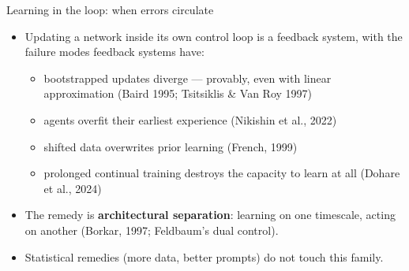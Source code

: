 \documentclass[11pt]{beamer}
\begin{document}
\begin{frame}{Learning in the loop: when errors circulate}
  \begin{itemize}
    \item Updating a network inside its own control loop is a \alert{feedback
          system}, with the failure modes feedback systems have:
          \begin{itemize}
            \item bootstrapped updates diverge --- provably, even with linear
                  approximation (Baird 1995; Tsitsiklis \& Van Roy 1997)
            \item agents overfit their earliest experience (Nikishin et al., 2022)
            \item shifted data overwrites prior learning (French, 1999)
            \item prolonged continual training destroys the capacity to learn
                  at all (Dohare et al., 2024)
          \end{itemize}
    \item The remedy is \textbf{architectural separation}: learning on one
          timescale, acting on another (Borkar, 1997; Feldbaum's dual control).
    \item Statistical remedies (more data, better prompts) do not touch
          this family.
  \end{itemize}
\end{frame}
\end{document}

